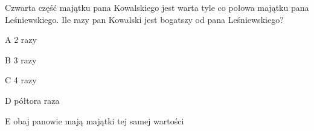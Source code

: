 \begin{tresc}
Czwarta część majątku pana Kowalskiego jest warta tyle co połowa majątku pana Leśniewskiego. Ile razy pan Kowalski jest bogatszy od pana Leśniewskiego?
\end{tresc}
\begin{wariant}{A} 2 razy \end{wariant}
\begin{wariant}{B} 3 razy \end{wariant}
\begin{wariant}{C} 4 razy \end{wariant}
\begin{wariant}{D} półtora raza \end{wariant}
\begin{wariant}{E} obaj panowie mają majątki tej samej wartości \end{wariant}
